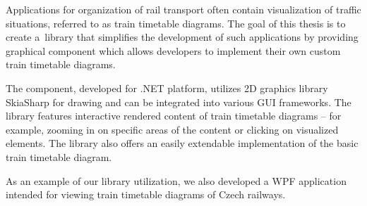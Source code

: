 \documentclass[12pt]{report}
\begin{document}
Applications for organization of rail transport often contain visualization of traffic situations, referred to as train timetable diagrams. The goal of this thesis is to create a~library that simplifies the development of such applications by providing graphical component which allows developers to implement their own custom train timetable diagrams.

The component, developed for .NET platform, utilizes 2D graphics library \linebreak SkiaSharp for drawing and can be integrated into various GUI frameworks. The library features interactive rendered content of train timetable diagrams -- for example, zooming in on specific areas of the content or clicking on visualized elements. The library also offers an easily extendable implementation of the basic train timetable diagram.

As an example of our library utilization, we also developed a WPF application intended for viewing train timetable diagrams of Czech railways.
\end{document}
